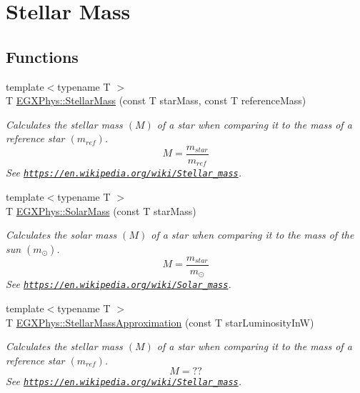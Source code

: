 \hypertarget{group___e_g_x_phys-_stellar_mass}{}\section{Stellar Mass}
\label{group___e_g_x_phys-_stellar_mass}
\subsection*{Functions}
\begin{DoxyCompactItemize}
\item 
{\footnotesize template$<$typename T $>$ }\\T \mbox{\hyperlink{group___e_g_x_phys-_stellar_mass_ga6c1b42cfd62e3174709ddbf15a87b460}{E\+G\+X\+Phys\+::\+Stellar\+Mass}} (const T star\+Mass, const T reference\+Mass)
\begin{DoxyCompactList}\small\item\em Calculates the stellar mass $(M)$ of a star when comparing it to the mass of a reference star $(m_{ref})$. \[M=\frac{m_{star}}{m_{ref}}\] See \href{https://en.wikipedia.org/wiki/Stellar_mass}{\tt https\+://en.\+wikipedia.\+org/wiki/\+Stellar\+\_\+mass}. \end{DoxyCompactList}\item 
{\footnotesize template$<$typename T $>$ }\\T \mbox{\hyperlink{group___e_g_x_phys-_stellar_mass_ga4988f903a27ec9cfa63f72b003d876fd}{E\+G\+X\+Phys\+::\+Solar\+Mass}} (const T star\+Mass)
\begin{DoxyCompactList}\small\item\em Calculates the solar mass $(M)$ of a star when comparing it to the mass of the sun $(m_\odot)$. \[M=\frac{m_{star}}{m_\odot}\] See \href{https://en.wikipedia.org/wiki/Solar_mass}{\tt https\+://en.\+wikipedia.\+org/wiki/\+Solar\+\_\+mass}. \end{DoxyCompactList}\item 
{\footnotesize template$<$typename T $>$ }\\T \mbox{\hyperlink{group___e_g_x_phys-_stellar_mass_ga5eeb9652876859bff3afdd352dd7925e}{E\+G\+X\+Phys\+::\+Stellar\+Mass\+Approximation}} (const T star\+Luminosity\+InW)
\begin{DoxyCompactList}\small\item\em Calculates the stellar mass $(M)$ of a star when comparing it to the mass of a reference star $(m_{ref})$. \[M=??\] See \href{https://en.wikipedia.org/wiki/Stellar_mass}{\tt https\+://en.\+wikipedia.\+org/wiki/\+Stellar\+\_\+mass}. \end{DoxyCompactList}\item 

\end{DoxyCompactItemize}
